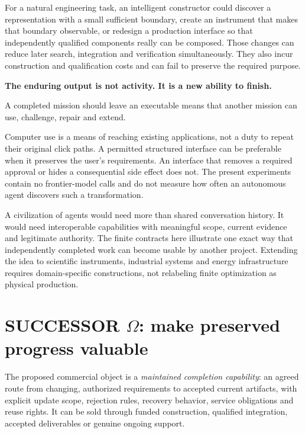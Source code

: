 \documentclass[11pt,letterpaper]{article}
\theoremstyle{definition}\newtheorem{definition}[theorem]{Definition}
\theoremstyle{remark}\newtheorem{remark}[theorem]{Remark}
\begin{document}
For a natural engineering task, an intelligent constructor could discover a representation with a small sufficient boundary, create an instrument that makes that boundary observable, or redesign a production interface so that independently qualified components really can be composed. Those changes can reduce later search, integration and verification simultaneously. They also incur construction and qualification costs and can fail to preserve the required purpose.

\begin{thesis}
\textbf{The enduring output is not activity. It is a new ability to finish.}\par\smallskip
A completed mission should leave an executable means that another mission can use, challenge, repair and extend.
\end{thesis}

Computer use is a means of reaching existing applications, not a duty to repeat their original click paths. A permitted structured interface can be preferable when it preserves the user's requirements. An interface that removes a required approval or hides a consequential side effect does not. The present experiments contain no frontier-model calls and do not measure how often an autonomous agent discovers such a transformation.

A civilization of agents would need more than shared conversation history. It would need interoperable capabilities with meaningful scope, current evidence and legitimate authority. The finite contracts here illustrate one exact way that independently completed work can become usable by another project. Extending the idea to scientific instruments, industrial systems and energy infrastructure requires domain-specific constructions, not relabeling finite optimization as physical production.

\section{SUCCESSOR \texorpdfstring{$\Omega$}{Omega}: make preserved progress valuable}
\label{sec:business}
The proposed commercial object is a \emph{maintained completion capability}: an agreed route from changing, authorized requirements to accepted current artifacts, with explicit update scope, rejection rules, recovery behavior, service obligations and reuse rights. It can be sold through funded construction, qualified integration, accepted deliverables or genuine ongoing support.
\end{document}
